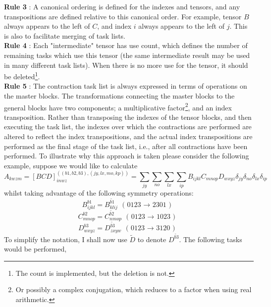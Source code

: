 \noindent \textbf{Rule 3} : A canonical ordering is defined for the indexes and tensors, and
any transpositions are defined relative to this canonical order. For example, tensor
$B$ always appears to the left of $C$, and index $i$ always appears to the left
of $j$. This is also to facilitate merging of task lists.\\

\noindent \textbf{Rule 4} : Each "intermediate" tensor has
use count, which defines the number of remaining tasks which use this tensor (the
same intermediate result may be used in many different task lists). When there is 
no more use for the tensor, it should be deleted\footnote{The count is
implemented, but the deletion is not.}.\\

\noindent \textbf{Rule 5} : The contraction task list is always expressed in terms
of operations on the master blocks.  The
transformations connecting the master blocks to the general blocks have two
components; a multiplicative factor\footnote{Or possibly a complex conjugation,
which reduces to a factor when using real arithmetic.}, and an index
transposition.  Rather than transposing the indexes of the tensor blocks, and
then executing the task list, the indexes over which the contractions are
performed are altered to reflect the index transpositions, and the actual
index transpositions are performed as the final stage of the task list, i.e.,
after all contractions have been performed. To illustrate why
this approach is taken please consider the following example, suppose we would
like to calculate
\begin{equation}
A_{kwzm} = 
[BCD]^{((b1,b2,b3),(jy,lx,mo,kp))}_{inwz} = \sum_{jy}\sum_{no}\sum_{lx}\sum_{ip} B_{ijkl}C_{mnop}D_{wxyz} \delta_{jy} \delta_{no} \delta_{lx}\delta_{ip}
\end{equation}
whilst taking advantage of the following symmetry operations:
\begin{equation*}
B_{ijkl}^{b1} = B_{klij}^{\tilde{b1}}  \text{ \ \ ( 0123 $\rightarrow$ 2301 ) }
\end{equation*}
\begin{equation*}
C_{mnop}^{b2} = C_{nmop}^{\tilde{b2}}  \text{ \ \ ( 0123 $\rightarrow$ 1023 ) }
\end{equation*}
\begin{equation*}
D_{wxyz}^{b3} = D_{zxyw}^{\tilde{b3}}  \text{ \ \ ( 0123 $\rightarrow$ 3120 ) }
\end{equation*}
To simplify the notation, I shall now use $\tilde{D}$ to denote $D^{\tilde{b3}}$. The following tasks would be performed,
